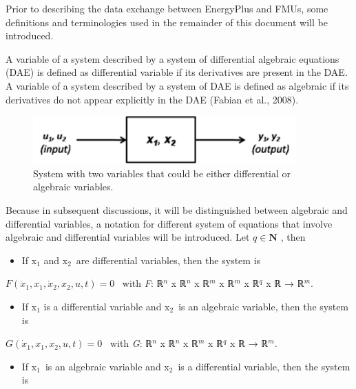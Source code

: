 Prior to describing the data exchange between EnergyPlus and FMUs, some definitions and terminologies used in the remainder of this document will be introduced.

A variable of a system described by a system of differential algebraic equations (DAE) is defined as differential variable if its derivatives are present in the DAE. A variable of a system described by a system of DAE is defined as algebraic if its derivatives do not appear explicitly in the DAE (Fabian et al., 2008).

\begin{figure}[hbtp] %
\centering
\includegraphics[width=0.9\textwidth, height=0.9\textheight, keepaspectratio=true]{media/image008.png}
\caption{System with two variables that could be either differential or algebraic variables. \protect \label{fig:system-with-two-variables-that-could-be}}
\end{figure}

Because in subsequent discussions, it will be distinguished between algebraic and differential variables, a notation for different system of equations that involve algebraic and differential variables will be introduced. Let \(q\in\mathbf{N}\) , then

\begin{itemize}
\tightlist
\item
  If x\(_{1}\) and x\(_{2}\)~are differential variables, then the system is
\end{itemize}

\(F\left(\dot x_1,x_1,\dot x_2,x_2,u,t\right) = 0\) ~with \emph{F}: ℝ\(^{n}\) x ℝ\(^{n}\) x ℝ\(^{m}\) x ℝ\(^{m}\) x ℝ\(^{q}\) x ℝ → ℝ\(^{m}\).

\begin{itemize}
\tightlist
\item
  If x\(_{1}\) is a differential variable and x\(_{2}\)~is an algebraic variable, then the system is
\end{itemize}

\(G\left(\dot x_1,x_1,x_2,u,t\right) = 0\) ~with \emph{G}: ℝ\(^{n}\) x ℝ\(^{n}\) x ℝ\(^{m}\) x ℝ\(^{q}\) x ℝ → ℝ\(^{m}\).

\begin{itemize}
\tightlist
\item
  If x\(_{1}\)~is an algebraic variable and x\(_{2}\)~is a differential variable, then the system is
\end{itemize}

